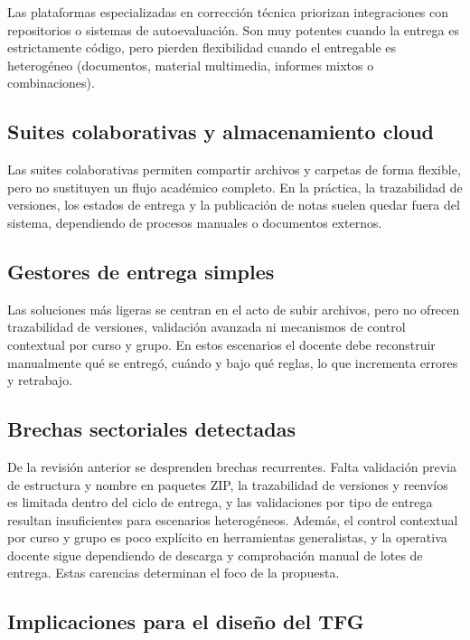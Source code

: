 Las plataformas especializadas en correcci\'on t\'ecnica priorizan
integraciones con repositorios o sistemas de autoevaluaci\'on.
Son muy potentes cuando la entrega es estrictamente c\'odigo,
pero pierden flexibilidad cuando el entregable es heterog\'eneo
(documentos, material multimedia, informes mixtos o combinaciones).

\subsection{Suites colaborativas y almacenamiento cloud}

Las suites colaborativas permiten compartir archivos y carpetas
de forma flexible, pero no sustituyen un flujo acad\'emico completo.
En la pr\'actica, la trazabilidad de versiones, los estados de entrega
y la publicaci\'on de notas suelen quedar fuera del sistema,
dependiendo de procesos manuales o documentos externos.

\subsection{Gestores de entrega simples}

Las soluciones m\'as ligeras se centran en el acto de subir archivos,
pero no ofrecen trazabilidad de versiones, validaci\'on avanzada
ni mecanismos de control contextual por curso y grupo. En estos
escenarios el docente debe reconstruir manualmente qu\'e se entreg\'o,
cu\'ando y bajo qu\'e reglas, lo que incrementa errores y retrabajo.

\subsection{Brechas sectoriales detectadas}

De la revisi\'on anterior se desprenden brechas recurrentes. Falta validaci\'on previa de estructura y nombre en paquetes ZIP, la trazabilidad de versiones y reenv\'ios es limitada dentro del ciclo de entrega, y las validaciones por tipo de entrega resultan insuficientes para escenarios heterog\'eneos. Adem\'as, el control contextual por curso y grupo es poco expl\'icito en herramientas generalistas, y la operativa docente sigue dependiendo de descarga y comprobaci\'on manual de lotes de entrega. Estas carencias determinan el foco de la propuesta.

\subsection{Implicaciones para el dise\~no del TFG}

